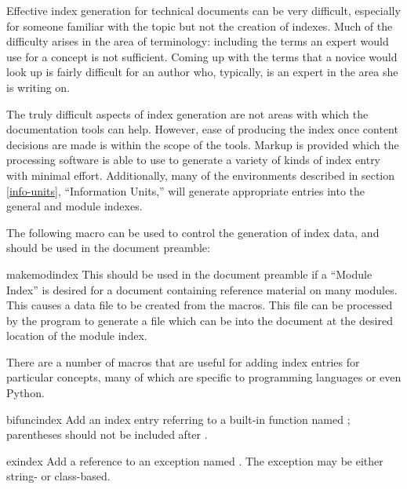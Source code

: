 \documentclass{howto}
\begin{document}
    Effective index generation for technical documents can be very
    difficult, especially for someone familiar with the topic but not
    the creation of indexes.  Much of the difficulty arises in the
    area of terminology: including the terms an expert would use for a
    concept is not sufficient.  Coming up with the terms that a novice
    would look up is fairly difficult for an author who, typically, is
    an expert in the area she is writing on.

    The truly difficult aspects of index generation are not areas with
    which the documentation tools can help.  However, ease
    of producing the index once content decisions are made is within
    the scope of the tools.  Markup is provided which the processing
    software is able to use to generate a variety of kinds of index
    entry with minimal effort.  Additionally, many of the environments
    described in section \ref{info-units}, ``Information Units,'' will
    generate appropriate entries into the general and module indexes.

    The following macro can be used to control the generation of index
    data, and should be used in the document preamble:

    \begin{macrodesc}{makemodindex}{}
      This should be used in the document preamble if a ``Module
      Index'' is desired for a document containing reference material
      on many modules.  This causes a data file
       to be created from the
       macros.  This file can be processed by the
       program to generate a file which can be
       into the document at the desired location of the
      module index.
    \end{macrodesc}

    There are a number of macros that are useful for adding index
    entries for particular concepts, many of which are specific to
    programming languages or even Python.

    \begin{macrodesc}{bifuncindex}{}
      Add an index entry referring to a built-in function named
      ; parentheses should not be included after
      .
    \end{macrodesc}

    \begin{macrodesc}{exindex}{}
      Add a reference to an exception named .  The
      exception may be either string- or class-based.
    \end{macrodesc}
\end{document}
